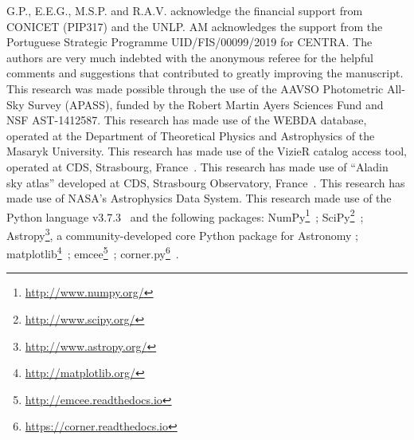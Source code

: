 \documentclass[draft]{aa}
\begin{document}
\begin{acknowledgements}

G.P., E.E.G., M.S.P. and R.A.V. acknowledge the financial support from CONICET 
(PIP317) and the UNLP.
AM acknowledges the support from the Portuguese Strategic Programme
UID/FIS/00099/2019 for CENTRA.
The authors are very much indebted with the anonymous referee for the helpful
comments and suggestions that contributed to greatly improving the manuscript.
%
This research was made possible through the use of the AAVSO Photometric
All-Sky Survey (APASS), funded by the Robert Martin Ayers Sciences Fund and NSF
AST-1412587.
%
This research has made use of the WEBDA database, operated at the Department of
Theoretical Physics and Astrophysics of the Masaryk University.
%
This research has made use of the VizieR catalog access tool, operated at CDS,
Strasbourg, France~\citep{Ochsenbein_2000}.
%
This research has made use of ``Aladin sky atlas'' developed at
CDS, Strasbourg Observatory, France~\citep{Bonnarel2000,Boch2014}.
%
This research has made use of NASA's Astrophysics Data System.
%
This research made use of the Python language v3.7.3~\citep{vanRossum_1995}
and the following packages:
NumPy\footnote{\url{http://www.numpy.org/}}~\citep{vanDerWalt_2011};
SciPy\footnote{\url{http://www.scipy.org/}}~\citep{Jones_2001};
Astropy\footnote{\url{http://www.astropy.org/}}, a community-developed core
Python package for Astronomy \citep{Astropy_2013};
matplotlib\footnote{\url{http://matplotlib.org/}}~\citep{hunter_2007};
emcee\footnote{\url{http://emcee.readthedocs.io}}~\citep{emcee};
corner.py\footnote{\url{https://corner.readthedocs.io}}~\citep{corner}.
\end{acknowledgements}



\end{document}
